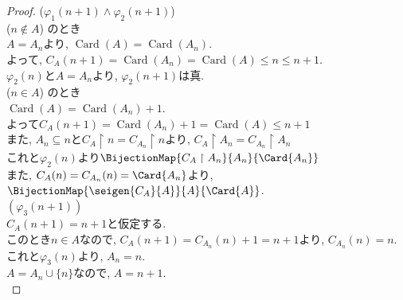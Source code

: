 \begin{proof}
 ($\varphi_1(n+1) \land \varphi_2(n+1)$)\\
 ($n \not\in A$) のとき\\
 $A=A_n$より,
 $\operatorname{Card}(A) = \operatorname{Card}(A_n).$\\
 よって,
 $C_A(n+1) = \operatorname{Card}(A_n) = \operatorname{Card}(A) \leq n \leq n+1.$\\
 $\varphi_2 (n)$と$A=A_n$より,
 $\varphi_2 (n+1)$は真.\\
 ($n \in A$) のとき\\
 $\operatorname{Card}(A) = \operatorname{Card}(A_n) + 1.$\\
 よって$C_A(n+1) = \operatorname{Card}(A_n) + 1 = \operatorname{Card}(A) \leq n+1$\\
 また,
 $A_n \subseteq n$と$C_A \restriction {n} = C_{A_n} \restriction {n}$より,
 $C_A \restriction {A_n} = C_{A_n} \restriction {A_n}$\\
 これと$\varphi_2(n)$より$\BijectionMap {C_A\restriction {A_n}}{A_n}{\Card{A_n}}$\\
 また,
 $C_A(n) = C_{A_n}(n) = \Card{A_n}$より,
 $\BijectionMap {\seigen {C_A}{A}}{A}{\Card{A}}$.\\
 
 $(\varphi_3(n+1))$\\
 $C_{A}(n+1)=n+1$と仮定する.\\
 このとき$n \in A$なので,
 $C_A(n+1) = C_{A_n}(n) + 1 = n + 1$より,
 $C_{A_n}(n) = n$.\\
 これと$\varphi_3(n)$より,
 $A_n = n$.\\
 $A = A_n \cup \{n\}$なので,
 $A = n+1$.\\
\end{proof}

